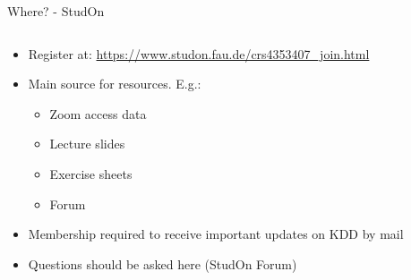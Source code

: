 \begin{frame}{Where? - StudOn}
	\begin{columns}
		\begin{column}{0.7\textwidth}
			\begin{itemize}
				\item Register at: \url{https://www.studon.fau.de/crs4353407_join.html}
				\item Main source for resources. E.g.:
				      \begin{itemize}
					      \item Zoom access data
					      \item Lecture slides
					      \item Exercise sheets
					      \item Forum
				      \end{itemize}
				\item Membership required to receive important updates on KDD by mail
				\item Questions should be asked here (StudOn Forum)

			\end{itemize}
		\end{column}
		\begin{column}{0.3\textwidth}
			\begin{center}
			\end{center}
		\end{column}
	\end{columns}

\end{frame}


